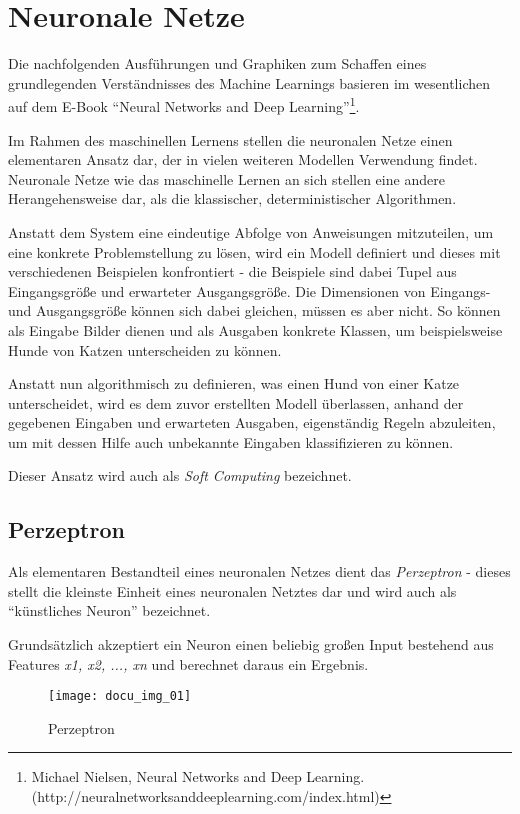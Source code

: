 \section{Neuronale Netze}

Die nachfolgenden Ausführungen und Graphiken zum Schaffen eines grundlegenden Verständnisses des Machine Learnings
basieren im wesentlichen auf dem E-Book ``Neural Networks and Deep Learning''\footnote{Michael Nielsen, Neural Networks and Deep Learning.\newline
(http://neuralnetworksanddeeplearning.com/index.html)}.

Im Rahmen des maschinellen Lernens stellen die neuronalen Netze einen elementaren Ansatz dar,
der in vielen weiteren Modellen Verwendung findet. Neuronale Netze wie das maschinelle Lernen an sich
stellen eine andere Herangehensweise dar, als die klassischer, deterministischer Algorithmen.

Anstatt dem System eine eindeutige Abfolge von Anweisungen mitzuteilen, um eine konkrete Problemstellung
zu lösen, wird ein Modell definiert und dieses mit verschiedenen Beispielen konfrontiert - die Beispiele
sind dabei Tupel aus Eingangsgröße und erwarteter Ausgangsgröße. Die Dimensionen von Eingangs- und Ausgangsgröße
können sich dabei gleichen, müssen es aber nicht. So können als Eingabe Bilder dienen und als
Ausgaben konkrete Klassen, um beispielsweise Hunde von Katzen unterscheiden zu können.

Anstatt nun algorithmisch zu definieren, was einen Hund von einer Katze unterscheidet, wird es dem zuvor
erstellten Modell überlassen, anhand der gegebenen Eingaben und erwarteten Ausgaben, eigenständig Regeln abzuleiten, um mit
dessen Hilfe auch unbekannte Eingaben klassifizieren zu können.

Dieser Ansatz wird auch als \textit{Soft Computing} bezeichnet.

\subsection{Perzeptron}

Als elementaren Bestandteil eines neuronalen Netzes dient das \textit{Perzeptron} - dieses stellt
die kleinste Einheit eines neuronalen Netztes dar und wird auch als ``künstliches Neuron'' bezeichnet.

Grundsätzlich akzeptiert ein Neuron einen beliebig großen Input bestehend aus Features \textit{x1, x2, ..., xn} und
berechnet daraus ein Ergebnis.

\begin{figure}[h]
    \centering
    \texttt{[image: docu\_img\_01]}
    \caption{Perzeptron}
    \label{fig:perzeptron}
\end{figure}

